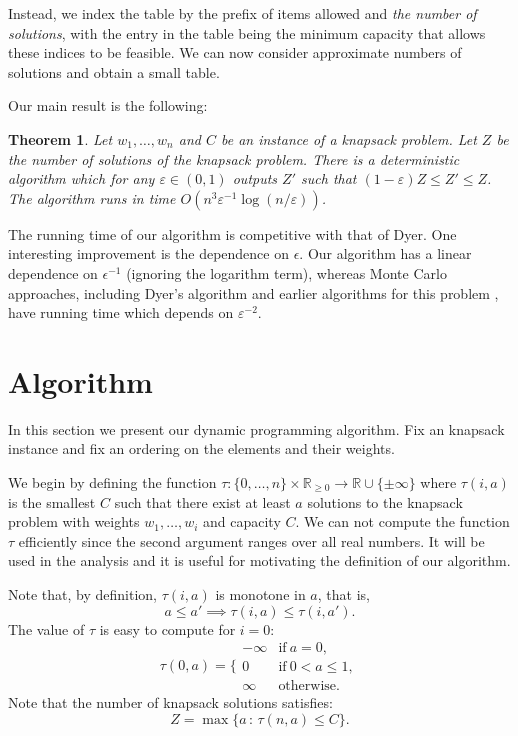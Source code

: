 \documentclass[11pt]{article}
\def\R{\mathbb{R}}
\def\eps{\varepsilon}
\def\ra{\rightarrow}
\newtheorem{theorem}{Theorem}[section]
\begin{document}
Instead, we index the table by the prefix of items
allowed and {\em the number of solutions}, with the entry in the
table being the minimum capacity that allows these indices to be
feasible. We can now consider approximate numbers of solutions and
obtain a small table.

Our main result is the following:

\begin{theorem}\label{thm:main}
Let $w_1,\dots,w_n$ and $C$ be an instance of a knapsack problem. Let $Z$ be the number
of solutions of the knapsack problem. There is a deterministic algorithm which
for any $\eps\in (0,1)$ outputs $Z'$ such that $(1-\eps) Z\leq Z'\leq Z$.
The algorithm runs in time $O(n^{3}\eps^{-1}\log(n/\eps))$.
\end{theorem}

The running time of our algorithm is competitive with that of
Dyer. One interesting improvement is the dependence on $\epsilon$.
Our algorithm has a linear dependence on $\epsilon^{-1}$ (ignoring
the logarithm term), whereas Monte Carlo approaches, including
Dyer's algorithm \cite{Dyer} and earlier algorithms for this
problem \cite{MorrisSinclair,DFKKPV}, have running time which
depends on $\eps^{-2}$.

\section{Algorithm}
\label{sec:algorithm}

In this section we present our dynamic programming algorithm.
Fix an knapsack instance and fix an ordering on the elements and their weights.

We begin by defining the function
$\tau:\{0,\dots,n\}\times\R_{\geq 0}\ra\R\cup\{\pm\infty\}$
where $\tau(i,a)$ is the smallest
$C$ such that there exist at least $a$ solutions to the knapsack problem with weights
$w_1,\dots,w_i$ and capacity $C$.
We can not compute the function $\tau$ efficiently since the second argument
ranges over all real numbers.  It will be used in the analysis and it is useful
for motivating the definition of our algorithm.

Note that, by definition, $\tau(i,a)$ is monotone in
$a$, that is,
\begin{equation}\label{monot}
a\leq a' \implies \tau(i,a)\leq\tau(i,a').
\end{equation}
The value of $\tau$ is easy to compute for $i=0$:
\begin{equation}\label{basi}
\tau(0,a)=\Bigg\{\begin{array}{rl}
-\infty & \mbox{if}\ a=0,\\
  0 & \mbox{if}\ 0<a\leq 1,\\
  \infty & \mbox{otherwise}.
\end{array}
\end{equation}
Note that the number of knapsack solutions satisfies:
\begin{equation}\label{number}
Z=\max\{a\, : \, \tau(n,a)\leq C\}.
\end{equation}
\end{document}
